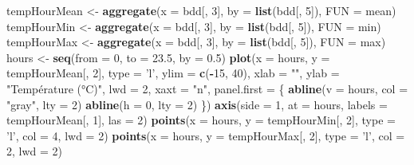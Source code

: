\documentclass[]{book}
\newenvironment{Shaded}{\begin{snugshade}}{\end{snugshade}}
\newcommand{\KeywordTok}[1]{\textcolor[rgb]{0.13,0.29,0.53}{\textbf{#1}}}
\newcommand{\DataTypeTok}[1]{\textcolor[rgb]{0.13,0.29,0.53}{#1}}
\newcommand{\DecValTok}[1]{\textcolor[rgb]{0.00,0.00,0.81}{#1}}
\newcommand{\FloatTok}[1]{\textcolor[rgb]{0.00,0.00,0.81}{#1}}
\newcommand{\StringTok}[1]{\textcolor[rgb]{0.31,0.60,0.02}{#1}}
\newcommand{\OperatorTok}[1]{\textcolor[rgb]{0.81,0.36,0.00}{\textbf{#1}}}
\newcommand{\NormalTok}[1]{#1}
\theoremstyle{definition}
\theoremstyle{definition}
\theoremstyle{definition}
\theoremstyle{remark}
\begin{document}
\begin{Shaded}
\begin{Highlighting}[]
\NormalTok{tempHourMean <-}\StringTok{ }\KeywordTok{aggregate}\NormalTok{(}\DataTypeTok{x =}\NormalTok{ bdd[, }\DecValTok{3}\NormalTok{], }\DataTypeTok{by =} \KeywordTok{list}\NormalTok{(bdd[, }\DecValTok{5}\NormalTok{]), }\DataTypeTok{FUN =}\NormalTok{ mean)}
\NormalTok{tempHourMin <-}\StringTok{ }\KeywordTok{aggregate}\NormalTok{(}\DataTypeTok{x =}\NormalTok{ bdd[, }\DecValTok{3}\NormalTok{], }\DataTypeTok{by =} \KeywordTok{list}\NormalTok{(bdd[, }\DecValTok{5}\NormalTok{]), }\DataTypeTok{FUN =}\NormalTok{ min)}
\NormalTok{tempHourMax <-}\StringTok{ }\KeywordTok{aggregate}\NormalTok{(}\DataTypeTok{x =}\NormalTok{ bdd[, }\DecValTok{3}\NormalTok{], }\DataTypeTok{by =} \KeywordTok{list}\NormalTok{(bdd[, }\DecValTok{5}\NormalTok{]), }\DataTypeTok{FUN =}\NormalTok{ max)}
\NormalTok{hours <-}\StringTok{ }\KeywordTok{seq}\NormalTok{(}\DataTypeTok{from =} \DecValTok{0}\NormalTok{, }\DataTypeTok{to =} \FloatTok{23.5}\NormalTok{, }\DataTypeTok{by =} \FloatTok{0.5}\NormalTok{)}
\KeywordTok{plot}\NormalTok{(}\DataTypeTok{x =}\NormalTok{ hours, }
    \DataTypeTok{y =}\NormalTok{ tempHourMean[, }\DecValTok{2}\NormalTok{], }\DataTypeTok{type =} \StringTok{'l'}\NormalTok{, }\DataTypeTok{ylim =} \KeywordTok{c}\NormalTok{(}\OperatorTok{-}\DecValTok{15}\NormalTok{, }\DecValTok{40}\NormalTok{), }
    \DataTypeTok{xlab =} \StringTok{""}\NormalTok{, }\DataTypeTok{ylab =} \StringTok{"Température (°C)"}\NormalTok{, }\DataTypeTok{lwd =} \DecValTok{2}\NormalTok{, }
    \DataTypeTok{xaxt =} \StringTok{"n"}\NormalTok{, }\DataTypeTok{panel.first =}\NormalTok{ \{}
        \KeywordTok{abline}\NormalTok{(}\DataTypeTok{v =}\NormalTok{ hours, }\DataTypeTok{col =} \StringTok{"gray"}\NormalTok{, }\DataTypeTok{lty =} \DecValTok{2}\NormalTok{)}
        \KeywordTok{abline}\NormalTok{(}\DataTypeTok{h =} \DecValTok{0}\NormalTok{, }\DataTypeTok{lty =} \DecValTok{2}\NormalTok{)  }
\NormalTok{    \})}
\KeywordTok{axis}\NormalTok{(}\DataTypeTok{side =} \DecValTok{1}\NormalTok{, }\DataTypeTok{at =}\NormalTok{ hours, }\DataTypeTok{labels =}\NormalTok{ tempHourMean[, }\DecValTok{1}\NormalTok{], }\DataTypeTok{las =} \DecValTok{2}\NormalTok{)}
\KeywordTok{points}\NormalTok{(}\DataTypeTok{x =}\NormalTok{ hours, }\DataTypeTok{y =}\NormalTok{ tempHourMin[, }\DecValTok{2}\NormalTok{], }\DataTypeTok{type =} \StringTok{'l'}\NormalTok{, }\DataTypeTok{col =} \DecValTok{4}\NormalTok{, }\DataTypeTok{lwd =} \DecValTok{2}\NormalTok{)}
\KeywordTok{points}\NormalTok{(}\DataTypeTok{x =}\NormalTok{ hours, }\DataTypeTok{y =}\NormalTok{ tempHourMax[, }\DecValTok{2}\NormalTok{], }\DataTypeTok{type =} \StringTok{'l'}\NormalTok{, }\DataTypeTok{col =} \DecValTok{2}\NormalTok{, }\DataTypeTok{lwd =} \DecValTok{2}\NormalTok{)}
\end{Highlighting}
\end{Shaded}
\end{document}
